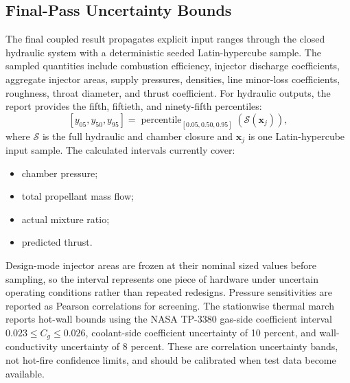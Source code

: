 \documentclass[11pt]{article}
\begin{document}
\subsection{Final-Pass Uncertainty Bounds}
The final coupled result propagates explicit input ranges through the closed hydraulic system with a deterministic seeded Latin-hypercube sample. The sampled quantities include combustion efficiency, injector discharge coefficients, aggregate injector areas, supply pressures, densities, line minor-loss coefficients, roughness, throat diameter, and thrust coefficient. For hydraulic outputs, the report provides the fifth, fiftieth, and ninety-fifth percentiles:
\begin{equation}
\left[y_{05},y_{50},y_{95}\right]
=\operatorname{percentile}_{[0.05,0.50,0.95]}\!\left(\mathcal{S}(\boldsymbol{x}_j)\right),
\label{eq:uncertainty-bounds}
\end{equation}
where $\mathcal{S}$ is the full hydraulic and chamber closure and $\boldsymbol{x}_j$ is one Latin-hypercube input sample. The calculated intervals currently cover:
\begin{itemize}[leftmargin=5mm]
\item chamber pressure;
\item total propellant mass flow;
\item actual mixture ratio;
\item predicted thrust.
\end{itemize}
Design-mode injector areas are frozen at their nominal sized values before sampling, so the interval represents one piece of hardware under uncertain operating conditions rather than repeated redesigns. Pressure sensitivities are reported as Pearson correlations for screening. The stationwise thermal march reports hot-wall bounds using the NASA TP-3380 gas-side coefficient interval $0.023\le C_g\le0.026$, coolant-side coefficient uncertainty of 10 percent, and wall-conductivity uncertainty of 8 percent. These are correlation uncertainty bands, not hot-fire confidence limits, and should be calibrated when test data become available.
\end{document}
